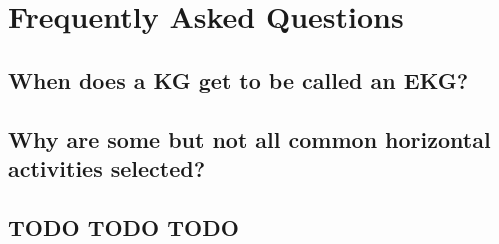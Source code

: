 \chapter{Frequently Asked Questions}
\label{ch:faq}

\section*{When does a KG get to be called an EKG?}

\section*{Why are some but not all common horizontal activities selected?}

\section*{TODO TODO TODO}
